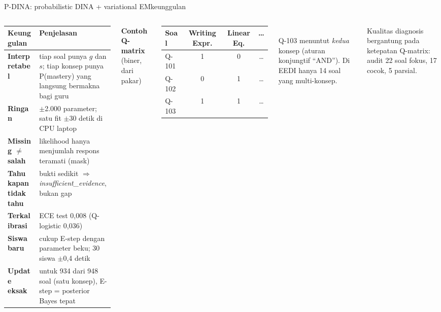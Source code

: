 \documentclass[aspectratio=169,10pt]{beamer}
\begin{document}
\begin{frame}{P-DINA: probabilistic DINA + variational EM}{keunggulan}
  \begin{columns}[T]
    \footnotesize
    \begin{tabularx}{\linewidth}{@{}>{\bfseries}l L@{}}
      \toprule
      Keunggulan & Penjelasan \\
      \midrule
      Interpretabel & tiap soal punya $g$ dan $s$; tiap konsep punya P(mastery) yang langsung bermakna bagi guru \\
      Ringan & $\pm$2.000 parameter; satu fit $\pm$30 detik di CPU laptop \\
      Missing $\neq$ salah & likelihood hanya menjumlah respons teramati (mask) \\
      Tahu kapan tidak tahu & bukti sedikit $\Rightarrow$ \emph{insufficient\_evidence}, bukan gap \\
      Terkalibrasi & ECE test 0,008 (Q-logistic 0,036) \\
      Siswa baru & cukup E-step dengan parameter beku; 30 siswa $\pm$0,4 detik \\
      Update eksak & untuk 934 dari 948 soal (satu konsep), E-step = posterior Bayes tepat \\
      \bottomrule
    \end{tabularx}
    \footnotesize
    \textbf{Contoh Q-matrix} (biner, dari pakar)\\[3pt]
    \begin{tabular}{@{}lccc@{}}
      \toprule
      Soal & Writing Expr. & Linear Eq. & \dots \\
      \midrule
      Q-101 & 1 & 0 & \dots \\
      Q-102 & 0 & 1 & \dots \\
      Q-103 & 1 & 1 & \dots \\
      \bottomrule
    \end{tabular}\\[4pt]
    Q-103 menuntut \emph{kedua} konsep (aturan konjungtif ``AND''). Di EEDI hanya 14 soal yang multi-konsep.
    \vspace{0.6em}
    \begin{warnbox}
      Kualitas diagnosis bergantung pada ketepatan Q-matrix: audit 22 soal fokus, 17 cocok, 5 parsial.
    \end{warnbox}
  \end{columns}
\end{frame}
\end{document}
